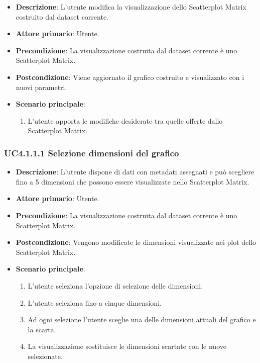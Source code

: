 \begin{itemize}
    \item \textbf{Descrizione}: L’utente modifica la visualizzazione dello Scatterplot Matrix
                                costruito dal dataset corrente.
	
    \item \textbf{Attore primario}: Utente.
    
    \item \textbf{Precondizione}:   La visualizzazione costruita dal dataset corrente è uno Scatterplot Matrix.

    \item \textbf{Postcondizione}:  Viene aggiornato il grafico costruito e visualizzato con i nuovi parametri.

	\item \textbf{Scenario principale}:
		\begin{enumerate}
            \item L'utente apporta le modifiche desiderate tra quelle offerte dallo Scatterplot Matrix.
        \end{enumerate}
\end{itemize}


\subsubsection{UC4.1.1.1 Selezione dimensioni del grafico}
\label{subsec:uc4.1.1}
\begin{itemize}
    \item \textbf{Descrizione}: L’utente dispone di dati con metadati assegnati e può 
                                scegliere fino a 5 dimensioni che possono essere  visualizzate nello Scatterplot Matrix.
	
    \item \textbf{Attore primario}: Utente.
    
    \item \textbf{Precondizione}:   La visualizzazione costruita dal dataset corrente è uno Scatterplot Matrix.
    \item \textbf{Postcondizione}:  Vengono modificate le dimensioni visualizzate nei plot dello Scatterplot Matrix.

	\item \textbf{Scenario principale}:
        \begin{enumerate}
            \item   L'utente seleziona l'opzione di selezione delle dimensioni.
            \item   L'utente seleziona fino a cinque dimensioni. 
           
            \item   Ad ogni selezione l'utente
                    sceglie una delle dimensioni attuali del grafico e la scarta.
           
            \item   La visualizzazione sostituisce le dimensioni scartate con le nuove selezionate.
        \end{enumerate}
\end{itemize}


